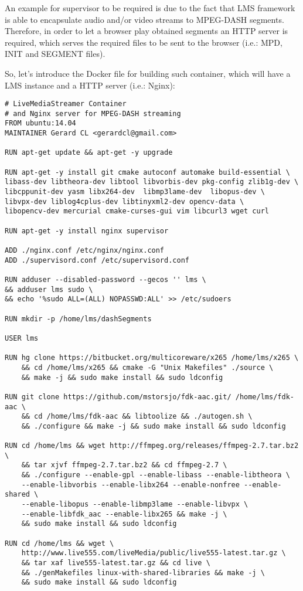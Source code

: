 An example for supervisor to be required is due to the fact that LMS framework is able to encapsulate audio and/or video streams to MPEG-DASH segments. Therefore, in order to let a browser play obtained segments an HTTP server is required, which serves the required files to be sent to the browser (i.e.: MPD, INIT and SEGMENT files).

So, let's introduce the Docker file for building such container, which will have a LMS instance and a HTTP server (i.e.: Nginx):
\begin{verbatim}
# LiveMediaStreamer Container
# and Nginx server for MPEG-DASH streaming
FROM ubuntu:14.04
MAINTAINER Gerard CL <gerardcl@gmail.com>

RUN apt-get update && apt-get -y upgrade

RUN apt-get -y install git cmake autoconf automake build-essential \ 
libass-dev libtheora-dev libtool libvorbis-dev pkg-config zlib1g-dev \
libcppunit-dev yasm libx264-dev  libmp3lame-dev  libopus-dev \
libvpx-dev liblog4cplus-dev libtinyxml2-dev opencv-data \
libopencv-dev mercurial cmake-curses-gui vim libcurl3 wget curl 

RUN apt-get -y install nginx supervisor

ADD ./nginx.conf /etc/nginx/nginx.conf
ADD ./supervisord.conf /etc/supervisord.conf

RUN adduser --disabled-password --gecos '' lms \
&& adduser lms sudo \
&& echo '%sudo ALL=(ALL) NOPASSWD:ALL' >> /etc/sudoers

RUN mkdir -p /home/lms/dashSegments

USER lms

RUN hg clone https://bitbucket.org/multicoreware/x265 /home/lms/x265 \
	&& cd /home/lms/x265 && cmake -G "Unix Makefiles" ./source \
	&& make -j && sudo make install && sudo ldconfig

RUN git clone https://github.com/mstorsjo/fdk-aac.git/ /home/lms/fdk-aac \
	&& cd /home/lms/fdk-aac && libtoolize && ./autogen.sh \
	&& ./configure && make -j && sudo make install && sudo ldconfig

RUN cd /home/lms && wget http://ffmpeg.org/releases/ffmpeg-2.7.tar.bz2 \
	&& tar xjvf ffmpeg-2.7.tar.bz2 && cd ffmpeg-2.7 \
	&& ./configure --enable-gpl --enable-libass --enable-libtheora \
	--enable-libvorbis --enable-libx264 --enable-nonfree --enable-shared \
	--enable-libopus --enable-libmp3lame --enable-libvpx \
	--enable-libfdk_aac --enable-libx265 && make -j \
	&& sudo make install && sudo ldconfig

RUN cd /home/lms && wget \
	http://www.live555.com/liveMedia/public/live555-latest.tar.gz \
	&& tar xaf live555-latest.tar.gz && cd live \
	&& ./genMakefiles linux-with-shared-libraries && make -j \
	&& sudo make install && sudo ldconfig


\end{verbatim}

